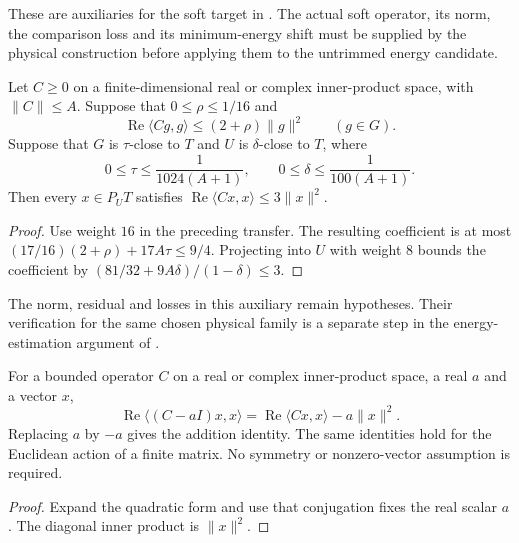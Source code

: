 These are auxiliaries for the soft target in
\cite[Theorem \texttt{t:aisefficient}, lines 1360--1371, and line 1807]
{Arad2016RigorousRG}. The actual soft operator, its norm, the comparison
loss and its minimum-energy shift must be supplied by the physical
construction before applying them to the untrimmed energy candidate.


\begin{lemma}
    \label{lem:regional_energy_calibration}
    \leanok
    Let $C\ge0$ on a finite-dimensional real or complex inner-product
    space, with $\|C\|\le A$. Suppose that $0\le\rho\le1/16$ and
    \[
        \operatorname{Re}\langle Cg,g\rangle\le(2+\rho)\|g\|^2
        \qquad(g\in G).
    \]
    Suppose that $G$ is $\tau$-close to $T$ and $U$ is $\delta$-close
    to $T$, where
    \[
        0\le\tau\le\frac1{1024(A+1)},\qquad
        0\le\delta\le\frac1{100(A+1)}.
    \]
    Then every $x\in P_U T$ satisfies
    $\operatorname{Re}\langle Cx,x\rangle\le3\|x\|^2$.
\end{lemma}
\begin{proof}\leanok
    Use weight $16$ in the preceding transfer. The resulting coefficient
    is at most
    $(17/16)(2+\rho)+17A\tau\le9/4$.
    Projecting into $U$ with weight $8$ bounds the coefficient by
    $(81/32+9A\delta)/(1-\delta)\le3$.
\end{proof}

The norm, residual and losses in this auxiliary remain hypotheses.
Their verification for the same chosen physical family is a separate
step in the energy-estimation argument of
\cite[proof of Theorem \texttt{t:alg1}, line 1807]{Arad2016RigorousRG}.


\begin{lemma}
    \label{lem:real_scalar_quadratic_shift}
    \leanok
    For a bounded operator $C$ on a real or complex inner-product space,
    a real $a$ and a vector $x$,
    \[
        \operatorname{Re}\langle(C-aI)x,x\rangle
        =\operatorname{Re}\langle Cx,x\rangle-a\|x\|^2.
    \]
    Replacing $a$ by $-a$ gives the addition identity. The same identities
    hold for the Euclidean action of a finite matrix. No symmetry or
    nonzero-vector assumption is required.
\end{lemma}
\begin{proof}\leanok
    Expand the quadratic form and use that conjugation fixes the real
    scalar $a$. The diagonal inner product is $\|x\|^2$.
\end{proof}
